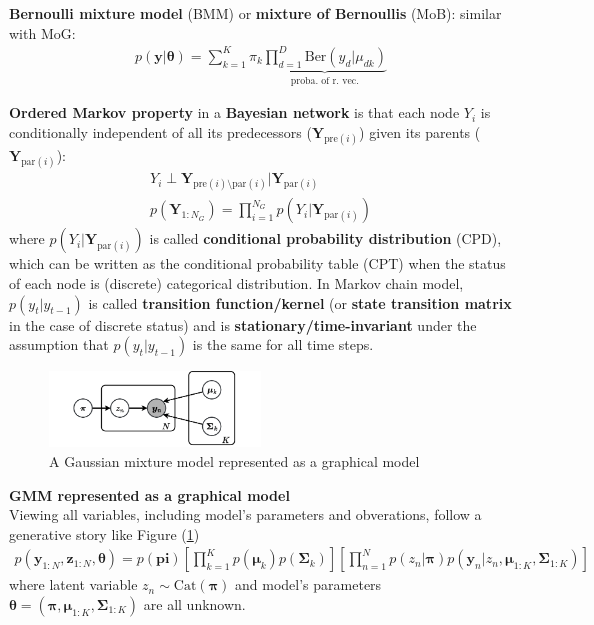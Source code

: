 \textbf{Bernoulli mixture model} (BMM) or \textbf{mixture of Bernoullis} (MoB):
similar with MoG:
\begin{gather}
    p(\bm{y}|\bm{\theta})=\sum_{k=1}^K{\pi_k\underbrace{\prod_{d=1}^D\mathrm{Ber}(y_d|\mu_{dk})}_{\text{proba. of r. vec.}}}
\end{gather}

\textbf{Ordered Markov property} in a \textbf{Bayesian network} is that 
each node $Y_i$ is conditionally independent of all its predecessors ($\bm{Y}_{\text{pre}(i)}$) given its parents ($\bm{Y}_{\text{par}(i)}$):
\begin{gather}
    Y_i\perp\bm{Y}_{\text{pre}(i)\setminus\text{par}(i)}|\bm{Y}_{\text{par}(i)}\\
    p(\bm{Y}_{1:N_G})=\prod_{i=1}^{N_G}p\left(Y_i|\bm{Y}_{\text{par}(i)}\right)
\end{gather}
where $p\left(Y_i|\bm{Y}_{\text{par}(i)}\right)$ is called \textbf{conditional probability distribution} (CPD), 
which can be written as the conditional probability table (CPT) 
when the status of each node is (discrete) categorical distribution.
In Markov chain model, 
$p(y_t|y_{t-1})$ is called \textbf{transition function/kernel} (or \textbf{state transition matrix} in the case of discrete status) and is \textbf{stationary/time-invariant} under the assumption that $p(y_t|y_{t-1})$ is the same for all time steps.

\begin{figure}[hptb]
    \centering
    \includegraphics[width=0.5\textwidth]{figs/mixgaussian.pdf}
    \caption{A Gaussian mixture model represented as a graphical model}
    \label{fig:maxgaussian}
\end{figure}

\begin{example}
    \textbf{GMM represented as a graphical model}\\
    Viewing all variables, including model's parameters and obverations, 
    follow a generative story like Figure (\ref{fig:maxgaussian})
    {\small\begin{gather}
        p(\bm{y}_{1:N},\bm{z}_{1:N},\bm{\theta})
        = p(\bm{pi})
        \left[ \prod_{k=1}^K p(\bm{\mu}_k)p(\bm{\Sigma}_k) \right]
        \left[ \prod_{n=1}^N p(z_n|\bm{\pi})p(\bm{y}_n|z_n,\bm{\mu}_{1:K},\bm{\Sigma}_{1:K}) \right]
    \end{gather}}
    where latent variable $z_n\sim\text{Cat}(\bm{\pi})$ and model's parameters
    $\bm{\theta}=(\bm{\pi},\bm{\mu}_{1:K},\bm{\Sigma}_{1:K})$ are all unknown.
\end{example}


